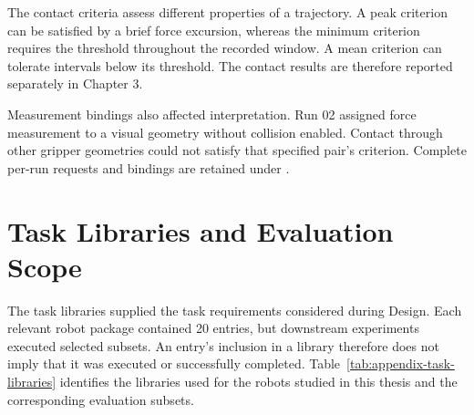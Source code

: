 The contact criteria assess different properties of a trajectory.
A peak criterion can be satisfied by a brief force excursion, whereas
the minimum criterion requires the threshold throughout the recorded window.
A mean criterion can tolerate intervals below its threshold.
The contact results are therefore reported separately in Chapter 3.

Measurement bindings also affected interpretation. Run 02 assigned force
measurement to a visual geometry without collision enabled.
Contact through other gripper geometries could not satisfy that specified
pair's criterion. Complete per-run requests and bindings are retained under
.

\section{Task Libraries and Evaluation Scope}
\label{sec:appendix-tasks}

The task libraries supplied the task requirements considered during Design.
Each relevant robot package contained 20 entries, but downstream experiments
executed selected subsets. An entry's inclusion in a library therefore
does not imply that it was executed or successfully completed.
Table~\ref{tab:appendix-task-libraries} identifies the libraries used for the
robots studied in this thesis and the corresponding evaluation subsets.

